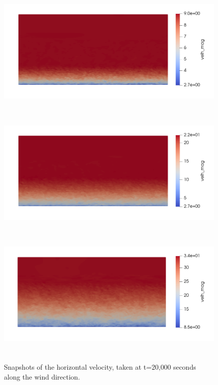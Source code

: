 \begin{figure}[hbt!]
  \centering
   \\
  \includegraphics[height=2.5in]{figures/snapshots/05ms/velh_mag_side.png} \\

  \includegraphics[height=2.5in]{figures/snapshots/10ms/velh_mag_side.png} \\

  \includegraphics[height=2.5in]{figures/snapshots/15ms/velh_mag_side.png} \\
    
  \caption{ \label{fig:SnapshotsSide} Snapshots of the horizontal
    velocity, taken at t=20,000 seconds along the wind direction. }
\end{figure}

